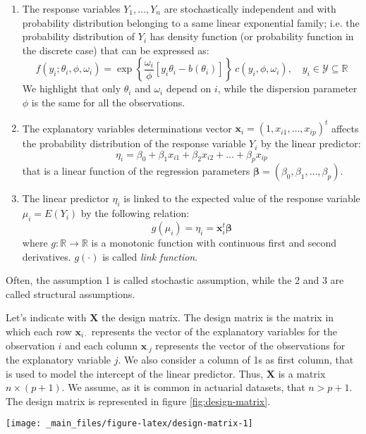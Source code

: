 \documentclass[a4paper, twoside, openright, 12pt]{report}
\let\origfigure\figure
\let\endorigfigure\endfigure
\renewenvironment{figure}[1][2] {
  \expandafter\origfigure\expandafter[!hbtp]
} {
  \endorigfigure
}
\theoremstyle{definition}
\theoremstyle{definition}
\theoremstyle{definition}
\theoremstyle{remark}
\begin{document}
\begin{enumerate}[itemsep=4pt]
\item The response variables $Y_1, \dots, Y_n$ are stochastically independent and with probability distribution belonging to a same linear exponential family; i.e. the probability distribution of $Y_i$ has density function (or probability function in the discrete case) that can be expressed as:
$$
f(y_i; \theta_i, \phi, \omega_i) = \exp{\left\{ \frac{\omega_i}{\phi} \left[y_i\theta_i - b(\theta_i) \right] \right\}} \ c(y_i, \phi, \omega_i), \quad y_i\in \mathcal{Y}\subseteq\mathbb{R}
$$
We highlight that only $\theta_i$ and $\omega_i$ depend on $i$, while the dispersion parameter $\phi$ is the same for all the observations.
\item The explanatory variables determinations vector $\boldsymbol{x}_i = \left(1, x_{i1}, \dots, x_{ip} \right)^t$ affects the probability distribution of the response variable $Y_i$ by the linear predictor:
$$
\eta_i = \beta_0 + \beta_1 x_{i1} + \beta_2 x_{i2} + \dots + \beta_p x_{ip}
$$
that is a linear function of the regression parameters $\boldsymbol{\beta} = \left( \beta_0, \beta_1, \dots, \beta_p \right)$.
\item The linear predictor $\eta_i$ is linked to the expected value of the response variable $\mu_i = E(Y_i)$ by the following relation:
$$
g(\mu_i) = \eta_i = \boldsymbol{x}_i^t \boldsymbol{\beta}
$$
where $g:\mathbb{R}\rightarrow\mathbb{R}$ is a monotonic function with continuous first and second derivatives. $g(\cdot)$ is called \textit{link function}.
\end{enumerate}

Often, the assumption 1 is called stochastic assumption, while the 2 and 3 are called structural assumptions.

Let's indicate with \(\boldsymbol{X}\) the design matrix. The design matrix is the matrix in which each row \(\boldsymbol{x}_{i\cdot}\) represents the vector of the explanatory variables for the observation \(i\) and each column \(\boldsymbol{x}_{\cdot j}\) represents the vector of the observations for the explanatory variable \(j\). We also consider a column of 1s as first column, that is used to model the intercept of the linear predictor. Thus, \(\boldsymbol{X}\) is a matrix \(n\times(p+1)\). We assume, as it is common in actuarial datasets, that \(n>p+1\). The design matrix is represented in figure \ref{fig:design-matrix}.

\begin{figure}[!hbtp]

{\centering \texttt{[image: \_main\_files/figure-latex/design-matrix-1]} 

}

\caption{Design Matrix $\boldsymbol{X}$.}\label{fig:design-matrix}
\end{figure}
\end{document}
